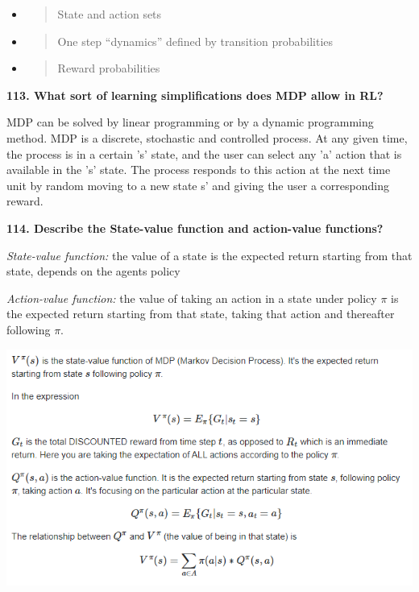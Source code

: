 \begin{itemize}
\item
  \begin{quote}
  State and action sets
  \end{quote}
\item
  \begin{quote}
  One step ``dynamics'' defined by transition probabilities
  \end{quote}
\item
  \begin{quote}
  Reward probabilities
  \end{quote}
\end{itemize}

\textbf{113. What sort of learning simplifications does MDP allow in
RL?}

MDP can be solved by linear programming or by a dynamic programming
method. MDP is a discrete, stochastic and controlled process. At any
given time, the process is in a certain 's' state, and the user can
select any 'a' action that is available in the 's' state. The process
responds to this action at the next time unit by random moving to a new
state s' and giving the user a corresponding reward.

\textbf{114. Describe the State-value function and action-value
functions?}

\textit{State-value function:} the value of a state is the expected
return starting from that state, depends on the agents policy

\textit{Action-value function:} the value of taking an action in a
state under policy $\pi$ is the expected return starting from that state,
taking that action and thereafter following $\pi$.

\includegraphics[width=\columnwidth]{media/image8.png}

